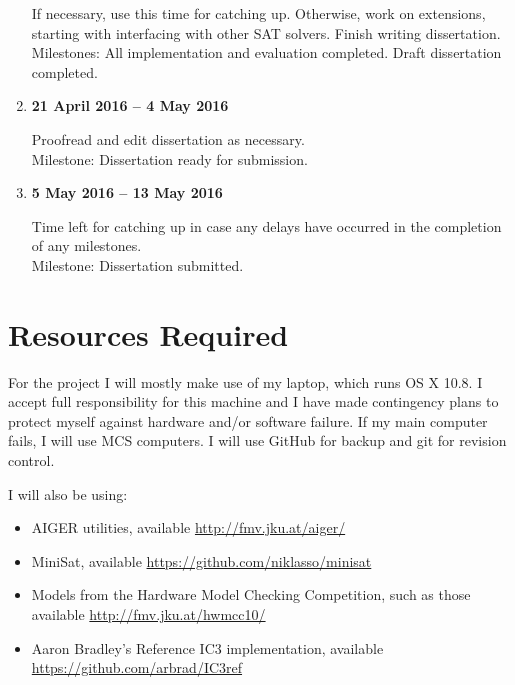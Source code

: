 \documentclass[12pt,a4paper,twoside]{article}
\begin{document}
\begin{enumerate}
If necessary, use this time for catching up.
Otherwise, work on extensions, starting with interfacing with other
SAT solvers.
Finish writing dissertation.
\\
Milestones: All implementation and evaluation completed.
Draft dissertation completed.

\item {\bf 21 April 2016 -- 4 May 2016}

Proofread and edit dissertation as necessary.
\\
Milestone: Dissertation ready for submission.

\item {\bf 5 May 2016 -- 13 May 2016}

Time left for catching up in case any delays have occurred in the
completion of any milestones.
\\
Milestone: Dissertation submitted.

\end{enumerate}

\section*{Resources Required}

For the project I will mostly make use of my laptop, which runs OS X 10.8.
I accept full responsibility for this machine and I have made contingency
plans to protect myself against hardware and/or software failure. 
If my main computer fails, I will use MCS computers.
I will use GitHub for backup and git for revision control.

\noindent I will also be using:
\begin{itemize}
\item AIGER utilities, available \url{http://fmv.jku.at/aiger/}
\item MiniSat, available \url{https://github.com/niklasso/minisat}
\item Models from the Hardware Model Checking Competition, such as those
available \url{http://fmv.jku.at/hwmcc10/}
\item Aaron Bradley's Reference IC3 implementation, available
\url{https://github.com/arbrad/IC3ref}
\end{itemize}



\end{document}

